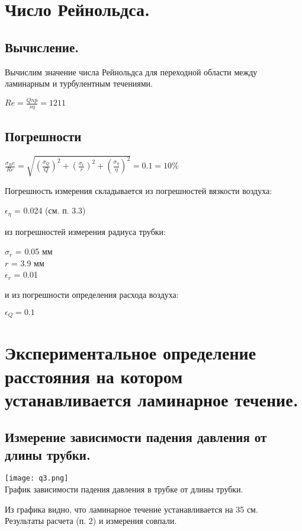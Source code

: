 \documentclass{article}
\begin{document}
\section{Число Рейнольдса.}
    \subsection{Вычисление.}
        Вычислим значение числа Рейнольдса для переходной области между ламинарным и турбулентным течениями.
        \begin{center}
            $Re = \frac{Qnp}{s\eta} = 1211$
        \end{center}
    \subsection{Погрешности}
        \begin{center}
            $\frac{\sigma_Re}{Re} = \sqrt{(\frac{\sigma_Q}{Q})^2 + (\frac{\sigma_r}{r})^2 + (\frac{\sigma_\eta}{\eta})^2} = 0.1 = 10\%$
        \end{center}
    Погрешность измерения складывается из погрешностей вязкости воздуха:
    \begin{center}
        $\epsilon_\eta$ = 0.024 (см. п. 3.3)
    \end{center}
    из погрешностей измерения радиуса трубки:
    \begin{center}
        $\sigma_r$ = 0.05 мм\\
        $r$ = 3.9 мм\\
        $\epsilon_r$ = 0.01
    \end{center}
    и из погрешности определения расхода воздуха:
    \begin{center}
        $\epsilon_Q = 0.1$
    \end{center}
\section{Экспериментальное определение расстояния на котором устанавливается ламинарное течение.}
    \subsection{Измерение зависимости падения давления от длины трубки.}
    \begin{center}
        \texttt{[image: q3.png]}\\
        График зависимости падения давления в трубке от длины трубки.
    \end{center}
    Из графика видно, что ламинарное течение устанавливается на 35 см.\\
    Результаты расчета (п. 2) и измерения совпали.
\end{document}
